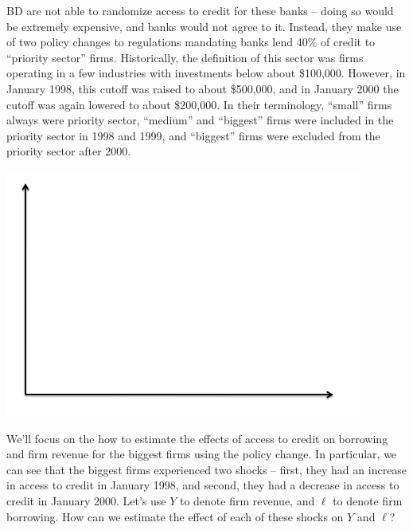 \documentclass[12pt,english]{article}
\begin{document}
BD are not able to randomize access to credit for these banks -- doing so would be extremely expensive, and banks would not agree to it. Instead, they make use of two policy changes to regulations mandating banks lend 40\% of credit to ``priority sector'' firms. Historically, the definition of this sector was firms operating in a few industries with investments below about \$100,000. However, in January 1998, this cutoff was raised to about \$500,000, and in January 2000 the cutoff was again lowered to about \$200,000. In their terminology, ``small'' firms always were priority sector, ``medium'' and ``biggest'' firms were included in the priority sector in 1998 and 1999, and ``biggest'' firms were excluded from the priority sector after 2000.

\begin{center}
	\begin{adjustbox}{
			max width=0.65\textwidth,
		}
		\includegraphics{axes.png}
	\end{adjustbox}
\end{center}

We'll focus on the how to estimate the effects of access to credit on borrowing and firm revenue for the biggest firms using the policy change. In particular, we can see that the biggest firms experienced two shocks -- first, they had an increase in access to credit in January 1998, and second, they had a decrease in access to credit in January 2000. Let's use $Y$ to denote firm revenue, and $\ell$ to denote firm borrowing. How can we estimate the effect of each of these shocks on $Y$ and $\ell$?
\end{document}
